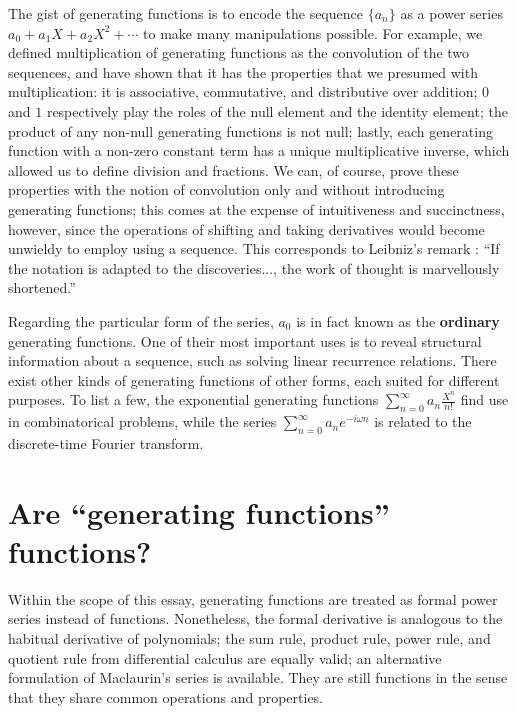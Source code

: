 \documentclass[a4paper, 12pt]{report}
\begin{document}
The gist of generating functions is to encode the sequence $\{a_n\}$ as a power series $a_0 + a_1 X + a_2 X^2 + \cdots$ to make many manipulations possible. For example, we defined multiplication of generating functions as the convolution of the two sequences, and have shown that it has the properties that we presumed with multiplication: it is associative, commutative, and distributive over addition; $0$ and $1$ respectively play the roles of the null element and the identity element; the product of any non-null generating functions is not null; lastly, each generating function with a non-zero constant term has a unique multiplicative inverse, which allowed us to define division and fractions. We can, of course, prove these properties with the notion of convolution only and without introducing generating functions; this comes at the expense of intuitiveness and succinctness, however, since the operations of shifting and taking derivatives would become unwieldy to employ using a sequence. This corresponds to Leibniz's remark \autocite[1]{zorich}: ``If the notation is adapted to the discoveries..., the work of thought is marvellously shortened.'' 

Regarding the particular form of the series, $a_0 $ is in fact known as the \textbf{ordinary} generating functions. One of their most important uses is to reveal structural information about a sequence, such as solving linear recurrence relations. There exist other kinds of generating functions of other forms, each suited for different purposes. To list a few, the exponential generating functions $\sum_{n = 0}^\infty a_n \frac{X^n}{n!}$ find use in combinatorical problems, while the series $\sum_{n = 0}^\infty a_n e^{-i\omega n}$ is related to the discrete-time Fourier transform.

\section{Are ``generating functions'' functions?}
Within the scope of this essay, generating functions are treated as formal power series instead of functions. Nonetheless, the formal derivative is analogous to the habitual derivative of polynomials; the sum rule, product rule, power rule, and quotient rule from differential calculus are equally valid; an alternative formulation of Maclaurin's series is available. They are still functions in the sense that they share common operations and properties.
\end{document}
